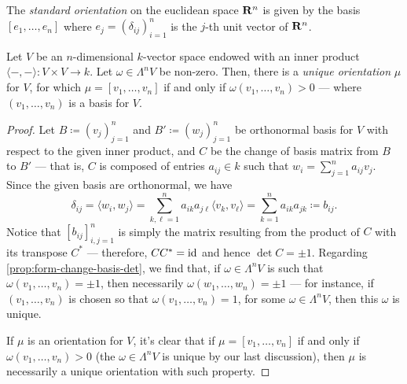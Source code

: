 \begin{definition}
    \label{def:standard-orientation-euclidean}
    The \emph{standard orientation} on the euclidean space \(\mathbf{R}^n\) is given by the
    basis \([e_1, \dots, e_n]\) where \(e_j = (\delta_{ij})_{i=1}^n\) is the
    \(j\)-th unit vector of \(\mathbf{R}^n\).
\end{definition}

\begin{corollary}\label{cor:unique-orientation}
    Let \(V\) be an \(n\)-dimensional \(k\)-vector space endowed with an inner
    product \(\langle -, - \rangle: V \times V \to k\). Let \(\omega \in \Lambda^n
    V\) be non-zero. Then, there is a \emph{unique orientation} \(\mu\) for \(V\),
    for which \(\mu = [v_1, \dots, v_n]\) if and only if \(\omega(v_1, \dots, v_n) >
    0\) --- where \((v_1, \dots, v_n)\) is a basis for \(V\).
\end{corollary}

\begin{proof}
    Let \(B \coloneq (v_j)_{j=1}^n\) and \(B' \coloneq (w_j)_{j=1}^n\) be
    orthonormal basis for \(V\) with respect to the given inner product, and \(C\)
    be the change of basis matrix from \(B\) to \(B'\) --- that is, \(C\) is
    composed of entries \(a_{ij} \in k\) such that \(w_i = \sum_{j=1}^n a_{ij}v_j\).
    Since the given basis are orthonormal, we have
    \[
        \delta_{i j} = \langle w_i, w_j \rangle
        = \sum_{k, \ell = 1}^n a_{i k} a_{j \ell} \langle v_k, v_{\ell} \rangle
        = \sum_{k=1}^n a_{i k} a_{j k}
        \coloneq b_{i j}.
    \]
    Notice that \([b_{ij}]_{i,j=1}^n\) is simply the matrix resulting from the
    product of \(C\) with its transpose \(C^{*}\) --- therefore, \(C C^{*} = \operatorname{id}\)
    and hence \(\det C = \pm 1\). Regarding \cref{prop:form-change-basis-det}, we
    find that, if \(\omega \in \Lambda^{n} V\) is such that \(\omega(v_1, \dots,
    v_n) = \pm 1\), then necessarily \(\omega(w_1, \dots, w_n) = \pm 1\) --- for
    instance, if \((v_1, \dots, v_n)\) is chosen so that \(\omega(v_1, \dots, v_n)
    = 1\), for some \(\omega \in \Lambda^n V\), then this \(\omega\) is unique.

    If \(\mu\) is an orientation for \(V\), it's clear that if \(\mu = [v_1, \dots,
    v_n]\) if and only if \(\omega(v_1, \dots, v_n) > 0\) (the \(\omega \in
    \Lambda^n V\) is unique by our last discussion), then \(\mu\) is necessarily a
    unique orientation with such property.
\end{proof}

